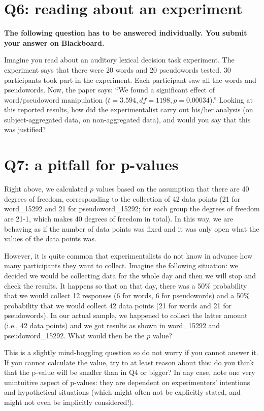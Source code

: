 \documentclass{article}\usepackage[]{graphicx}\usepackage[]{color}
\begin{document}
\section*{Q6: reading about an experiment}

\textbf{The following question has to be answered individually. You submit your answer on Blackboard.}

Imagine you read about an auditory lexical decision task experiment. The experiment says that there were 20 words and 20 pseudowords tested. 30 participants took part in the experiment. Each participant saw all the words and pseudowords. Now, the paper says: ``We found a significant effect of word/pseudoword manipulation ($t=3.594, df=1198, p=0.00034$).'' Looking at this reported results, how did the experimentalist carry out his/her analysis (on subject-aggregated data, on non-aggregated data), and would you say that this was justified?

\section*{Q7: a pitfall for p-values}

Right above, we calculated $p$ values based on the assumption that there are 40 degrees of freedom, corresponding to the collection of 42 data points (21 for word\_15292 and 21 for pseudoword\_15292; for each group the degrees of freedom are 21-1, which makes 40 degrees of freedom in total). In this way, we are behaving as if the number of data points was fixed and it was only open what the values of the data points was.

However, it is quite common that experimentalists do not know in advance how many participants they want to collect. 
Imagine the following situation: we decided we would be collecting data for the whole day and then we will stop and check the results. It happens so that on that day, there was a 50\% probability that we would collect 12 responses (6 for words, 6 for pseudowords) and a 50\% probability that we would collect 42 data points (21 for words and 21 for pseudowords). In our actual sample, we happened to collect the latter amount (i.e., 42 data points) and we got results as shown in word\_15292 and  pseudoword\_15292. What would then be the $p$ value?

This is a slightly mind-boggling question so do not worry if you cannot answer it. If you cannot calculate the value, try to at least reason about this: do you think that the p-value will be smaller than in Q4 or bigger? In any case, note one very unintuitive aspect of p-values: they are dependent on experimenters' intentions and hypothetical situations (which might often not be explicitly stated, and might not even be implicitly considered!).
\end{document}
